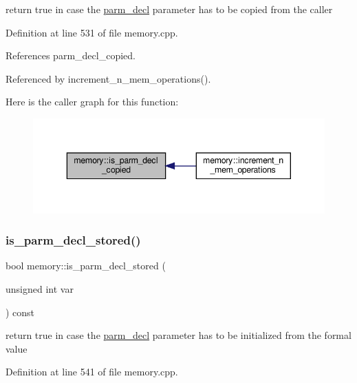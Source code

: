 return true in case the \hyperlink{structparm__decl}{parm\+\_\+decl} parameter has to be copied from the caller 



Definition at line 531 of file memory.\+cpp.



References parm\+\_\+decl\+\_\+copied.



Referenced by increment\+\_\+n\+\_\+mem\+\_\+operations().

Here is the caller graph for this function\+:
\nopagebreak
\begin{figure}[H]
\begin{center}
\leavevmode
\includegraphics[width=343pt]{d8/d99/classmemory_ae761b88fcafd4a0c6c7ae4426fe6ceb6_icgraph}
\end{center}
\end{figure}
\mbox{\label{classmemory_aea74338373012206d2b769a4f1e144c4}} 
\subsubsection{\texorpdfstring{is\+\_\+parm\+\_\+decl\+\_\+stored()}{is\_parm\_decl\_stored()}}
{\footnotesize\ttfamily bool memory\+::is\+\_\+parm\+\_\+decl\+\_\+stored (\begin{DoxyParamCaption}\item[{unsigned int}]{var }\end{DoxyParamCaption}) const}



return true in case the \hyperlink{structparm__decl}{parm\+\_\+decl} parameter has to be initialized from the formal value 



Definition at line 541 of file memory.\+cpp.



